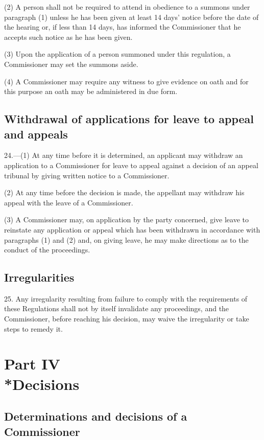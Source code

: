\documentclass[12pt,a4paper]{article}
\begin{document}
(2) A person shall not be required to attend in obedience to a summons under paragraph (1) unless he has been given at least 14 days' notice before the date of the hearing or, if less than 14 days, has informed the Commissioner that he accepts such notice as he has been given.

(3) Upon the application of a person summoned under this regulation, a Commissioner may set the summons aside.

(4) A Commissioner may require any witness to give evidence on oath and for this purpose an oath may be administered in due form.

\subsection[24. Withdrawal of applications for leave to appeal and appeals]{Withdrawal of applications for leave to appeal and appeals}

24.—(1) At any time before it is determined, an applicant may withdraw an application to a Commissioner for leave to appeal against a decision of an appeal tribunal by giving written notice to a Commissioner.

(2) At any time before the decision is made, the appellant may withdraw his appeal with the leave of a Commissioner.

(3) A Commissioner may, on application by the party concerned, give leave to reinstate any application or appeal which has been withdrawn in accordance with paragraphs (1) and (2) and, on giving leave, he may make directions as to the conduct of the proceedings.

\subsection[25. Irregularities]{Irregularities}

25.  Any irregularity resulting from failure to comply with the requirements of these Regulations shall not by itself invalidate any proceedings, and the Commissioner, before reaching his decision, may waive the irregularity or take steps to remedy it.

\section[Part IV --- Decisions]{Part IV\\*Decisions}

\subsection[26. Determinations and decisions of a Commissioner]{Determinations and decisions of a Commissioner}
\end{document}
